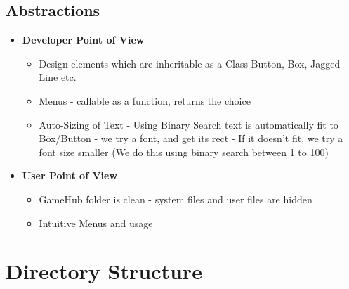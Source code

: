 \documentclass[12pt]{article}
\begin{document}
    \subsection{Abstractions}
    \begin{itemize}
        
        \item \textbf{Developer Point of View}
            \begin{itemize}
                \item Design elements which are inheritable as a Class Button, Box, Jagged Line etc.
                \item Menus - callable as a function, returns the choice  
                \item Auto-Sizing of Text - Using Binary Search text is automatically fit to Box/Button - we try a font, and get its rect - If it doesn't fit, we try a font size smaller (We do this using binary search between 1 to 100)
             
            \end{itemize}
        \item \textbf{User Point of View}
            \begin{itemize}
                \item GameHub folder is clean - system files and user files are hidden
                \item Intuitive Menus and usage             
            \end{itemize}
       

\end{itemize}


\section{Directory Structure}

\end{document}

